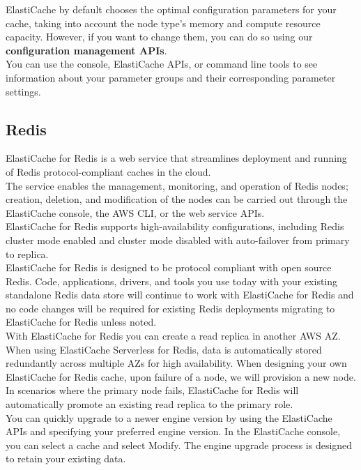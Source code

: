 \documentclass[12pt, letterpaper, twoside]{article}
\begin{document}
ElastiCache by default chooses the optimal configuration parameters for your cache, taking into account the node 
type's memory and compute resource capacity. However, if you want to change them, you can do so using our 
\textbf{configuration management APIs}.\\

You can use the console, ElastiCache APIs, or command line tools to see information about your parameter groups and
their corresponding parameter settings.

\subsection{Redis}
ElastiCache for Redis is a web service that streamlines deployment and running of Redis protocol-compliant caches in 
the cloud.\\
The service enables the management, monitoring, and operation of Redis nodes; creation, deletion, and modification of 
the nodes can be carried out through the ElastiCache console, the AWS CLI, or the web service APIs.\\
ElastiCache for Redis supports high-availability configurations, including Redis cluster mode enabled and cluster 
mode disabled with auto-failover from primary to replica.\\

ElastiCache for Redis is designed to be protocol compliant with open source Redis. Code, applications, drivers, and 
tools you use today with your existing standalone Redis data store will continue to work with ElastiCache for Redis 
and no code changes will be required for existing Redis deployments migrating to ElastiCache for Redis unless noted.\\

With ElastiCache for Redis you can create a read replica in another AWS AZ. When using ElastiCache Serverless 
for Redis, data is automatically stored redundantly across multiple AZs for high availability. When designing 
your own ElastiCache for Redis cache, upon failure of a node, we will provision a new node. In scenarios where 
the primary node fails, ElastiCache for Redis will automatically promote an existing read replica to the primary role.\\

You can quickly upgrade to a newer engine version by using the ElastiCache APIs and specifying your preferred engine 
version. In the ElastiCache console, you can select a cache and select Modify. The engine upgrade process is designed 
to retain your existing data.\\
\end{document}
